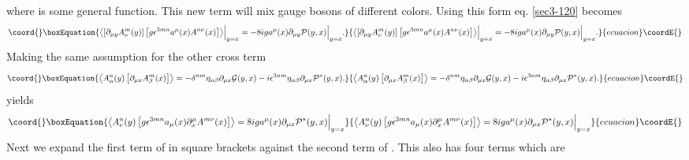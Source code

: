 \documentclass[a4paper,aps,showpacs]{revtex4}
\begin{document}
where \coordHE{} is some general function. This new term will
mix gauge bosons of different colors. Using this form eq. \eqref{sec3-120}
becomes
\begin{equation}\coord{}\boxEquation{
  \left\langle 
    \left[
    \partial_{\mu y} A^m_\nu (y) 
    \right]
    \left[
    g \epsilon^{3mn} a^\mu (x)
    A^{n \nu}(x)
    \right]
  \right\rangle \Bigr |_{y=x}  = 
  - 8 i g a^\mu(x) \partial_{\mu y} \mathcal P (y,x) \Bigr |_{y=x} .
\label{sec3-150}
}{
  \left\langle 
    \left[
    \partial_{\mu y} A^m_\nu (y) 
    \right]
    \left[
    g \epsilon^{3mn} a^\mu (x)
    A^{n \nu}(x)
    \right]
  \right\rangle \Bigr |_{y=x}  = 
  - 8 i g a^\mu(x) \partial_{\mu y} \mathcal P (y,x) \Bigr |_{y=x} .
}{ecuacion}\coordE{}\end{equation}
Making the same assumption for the other cross term 
\begin{equation}\coord{}\boxEquation{
  \left\langle
  A^n_\alpha (y) 
    \left[
    \partial_{\mu x} A^m_\beta (x)
    \right]
  \right\rangle = 
  -\delta^{nm} \eta_{\alpha \beta} \partial_{\mu x} \mathcal G (y,x) - 
  i \epsilon^{3nm} \eta_{\alpha \beta} \partial_{\mu x} \mathcal P^* (y,x) .
\label{sec3-160}
}{
  \left\langle
  A^n_\alpha (y) 
    \left[
    \partial_{\mu x} A^m_\beta (x)
    \right]
  \right\rangle = 
  -\delta^{nm} \eta_{\alpha \beta} \partial_{\mu x} \mathcal G (y,x) - 
  i \epsilon^{3nm} \eta_{\alpha \beta} \partial_{\mu x} \mathcal P^* (y,x) .
}{ecuacion}\coordE{}\end{equation}
yields
\begin{equation}\coord{}\boxEquation{
  \left\langle
  A^n_\nu (y) 
    \left[
    g \epsilon^{3mn} a_\mu (x) \partial^\mu_x A^{m\nu} (x)
    \right]   
  \right\rangle = 
  8 i g a^\mu (x) \partial_{\mu x} \mathcal P^* (y,x) \Bigr |_{y=x} 
\label{sec3-170}
}{
  \left\langle
  A^n_\nu (y) 
    \left[
    g \epsilon^{3mn} a_\mu (x) \partial^\mu_x A^{m\nu} (x)
    \right]   
  \right\rangle = 
  8 i g a^\mu (x) \partial_{\mu x} \mathcal P^* (y,x) \Bigr |_{y=x} 
}{ecuacion}\coordE{}\end{equation}
Next we expand the first term of \coordHE{}
in square brackets against the second term of \coordHE{}.
This also has four terms which are
\end{document}

